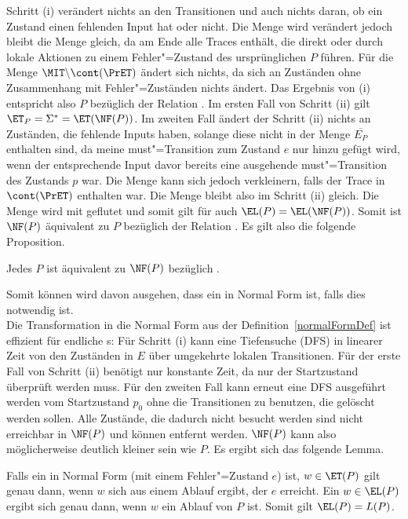 Schritt (i) verändert nichts an den Transitionen und auch nichts daran, ob ein
Zustand einen fehlenden Input hat oder nicht. Die Menge \StET{} wird verändert
jedoch bleibt die Menge \PrET{} gleich, da \StET{} am Ende alle Traces enthält,
die direkt oder durch lokale Aktionen zu einem Fehler"=Zustand des
ursprünglichen $P$ führen. Für die Menge $\MIT\backslash\cont (\PrET)$ ändert
sich nichts, da sich an Zuständen ohne Zusammenhang mit Fehler"=Zuständen
nichts ändert. Das Ergebnis von (i) entspricht also $P$ bezüglich der Relation
\ERel{}. Im ersten Fall von Schritt (ii) gilt $\ET _P =\Sigma ^* = \ET (\NF
(P))$. Im zweiten Fall ändert der Schritt (ii) nichts an Zuständen, die
fehlende Inputs haben, solange diese nicht in der Menge $\overline{E_P}$
enthalten sind, da meine must"=Transition zum Zustand $e$ nur hinzu gefügt
wird, wenn der entsprechende Input davor bereits eine ausgehende
must"=Transition des Zustands $p$ war. Die Menge \MIT{} kann sich jedoch
verkleinern, falls der Trace in $\cont (\PrET)$ enthalten war. Die Menge \ET
bleibt also im Schritt (ii) gleich. Die Menge \EL wird mit \ET geflutet und
somit gilt für \EL auch $\EL (P) = \EL (\NF (P))$. Somit ist $\NF (P)$
äquivalent zu $P$ bezüglich der Relation \ERel{}. Es gilt also die folgende
Proposition.

\begin{Prop}
  Jedes \MEIO{} $P$ ist äquivalent zu $\NF (P)$ bezüglich \ERel{}.
\end{Prop}

Somit können wird davon ausgehen, dass ein \MEIO{} in Normal Form ist, falls
dies notwendig ist.\\
Die Transformation in die Normal Form aus der Definition~\ref{normalFormDef}
ist effizient für endliche \MEIO{}s: Für Schritt (i)  kann eine Tiefensuche
(DFS) in linearer Zeit von den Zuständen in $E$ über umgekehrte lokalen
Transitionen. Für der erste Fall von Schritt (ii) benötigt nur konstante Zeit,
da nur der Startzustand überprüft werden muss. Für den zweiten Fall kann erneut
eine DFS ausgeführt werden vom Startzustand $p_0$ ohne die Transitionen zu
benutzen, die gelöscht werden sollen. Alle Zustände, die dadurch nicht besucht
werden sind nicht erreichbar in $\NF (P)$ und können entfernt werden. $\NF (P)$
kann also möglicherweise deutlich kleiner sein wie $P$. Es ergibt sich das
folgende Lemma.

\begin{Lem}
  Falls ein \MEIO{} in Normal Form (mit einem Fehler"=Zustand $e$) ist, $w\in
  \ET (P)$ gilt genau dann, wenn $w$ sich aus einem Ablauf ergibt, der $e$
  erreicht. Ein $w\in\EL (P)$ ergibt sich genau dann, wenn $w$ ein Ablauf von
  $P$ ist. Somit gilt $\EL (P) = L(P)$.
\end{Lem}

